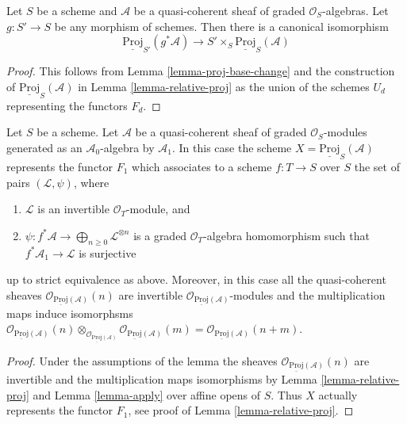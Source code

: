 \begin{lemma}
\label{lemma-relative-proj-base-change}
Let $S$ be a scheme and $\mathcal{A}$ be a quasi-coherent sheaf
of graded $\mathcal{O}_S$-algebras. Let $g : S' \to S$ be any morphism
of schemes. Then there is a canonical isomorphism
$$
\underline{\text{Proj}}_{S'}(g^*\mathcal{A})
\longrightarrow
S' \times_S \underline{\text{Proj}}_S(\mathcal{A})
$$
\end{lemma}

\begin{proof}
This follows from Lemma \ref{lemma-proj-base-change} and the construction
of $\underline{\text{Proj}}_S(\mathcal{A})$ in
Lemma \ref{lemma-relative-proj} as the union
of the schemes $U_d$ representing the functors $F_d$.
\end{proof}

\begin{lemma}
\label{lemma-apply-relative}
Let $S$ be a scheme.
Let $\mathcal{A}$ be a quasi-coherent sheaf of graded $\mathcal{O}_S$-modules
generated as an $\mathcal{A}_0$-algebra by $\mathcal{A}_1$.
In this case the scheme $X = \underline{\text{Proj}}_S(\mathcal{A})$
represents the functor $F_1$ which associates to a scheme
$f : T \to S$ over $S$ the set of pairs $(\mathcal{L}, \psi)$, where
\begin{enumerate}
\item $\mathcal{L}$ is an invertible $\mathcal{O}_T$-module, and
\item $\psi : f^*\mathcal{A} \to \bigoplus_{n \geq 0} \mathcal{L}^{\otimes n}$
is a graded $\mathcal{O}_T$-algebra homomorphism such that
$f^*\mathcal{A}_1 \to \mathcal{L}$ is surjective
\end{enumerate}
up to strict equivalence as above. Moreover, in this case all the
quasi-coherent sheaves
$\mathcal{O}_{\underline{\text{Proj}}(\mathcal{A})}(n)$
are invertible
$\mathcal{O}_{\underline{\text{Proj}}(\mathcal{A})}$-modules
and the multiplication maps induce isomorphsms
$
\mathcal{O}_{\underline{\text{Proj}}(\mathcal{A})}(n)
\otimes_{\mathcal{O}_{\underline{\text{Proj}}(\mathcal{A})}}
\mathcal{O}_{\underline{\text{Proj}}(\mathcal{A})}(m) =
\mathcal{O}_{\underline{\text{Proj}}(\mathcal{A})}(n + m)$.
\end{lemma}

\begin{proof}
Under the assumptions of the lemma the sheaves
$\mathcal{O}_{\underline{\text{Proj}}(\mathcal{A})}(n)$
are invertible and the multiplication maps isomorphisms
by Lemma \ref{lemma-relative-proj} and Lemma \ref{lemma-apply}
over affine opens of $S$. Thus $X$ actually represents the
functor $F_1$, see proof of Lemma \ref{lemma-relative-proj}.
\end{proof}












